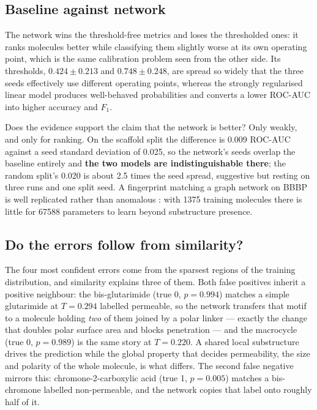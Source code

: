 \subsection{Baseline against network}

The network wins the threshold-free metrics and loses the thresholded ones: it ranks molecules better while classifying them slightly worse at its own operating point, which is the same calibration problem seen from the other side. Its thresholds, $0.424 \pm 0.213$ and $0.748 \pm 0.248$, are spread so widely that the three seeds effectively use different operating points, whereas the strongly regularised linear model produces well-behaved probabilities and converts a lower ROC-AUC into higher accuracy and $F_1$.

Does the evidence support the claim that the network is better? Only weakly, and only for ranking. On the scaffold split the difference is 0.009 ROC-AUC against a seed standard deviation of 0.025, so the network's seeds overlap the baseline entirely and \textbf{the two models are indistinguishable there}; the random split's 0.020 is about 2.5 times the seed spread, suggestive but resting on three runs and one split seed. A fingerprint matching a graph network on BBBP is well replicated rather than anomalous \parencite{Chemprop}: with 1375 training molecules there is little for \num{67588} parameters to learn beyond substructure presence.

\subsection{Do the errors follow from similarity?}

The four most confident errors come from the sparsest regions of the training distribution, and similarity explains three of them. Both false positives inherit a positive neighbour: the bis-glutarimide (true 0, $p = 0.994$) matches a simple glutarimide at $T = 0.294$ labelled permeable, so the network transfers that motif to a molecule holding \emph{two} of them joined by a polar linker --- exactly the change that doubles polar surface area and blocks penetration --- and the macrocycle (true 0, $p = 0.989$) is the same story at $T = 0.220$. A shared local substructure drives the prediction while the global property that decides permeability, the size and polarity of the whole molecule, is what differs. The second false negative mirrors this: chromone-2-carboxylic acid (true 1, $p = 0.005$) matches a bis-chromone labelled non-permeable, and the network copies that label onto roughly half of it.

